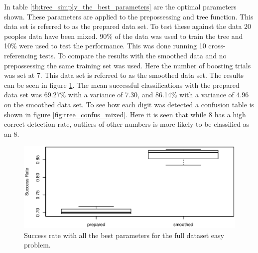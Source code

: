 In table \ref{tb:tree_simply_the_best_parameters} are the optimal parameters shown.
These parameters are applied to the prepossessing and tree function. 
This data set is referred to as the prepared data set.
To test these against the data 20 peoples data have been mixed.
90\% of the data was used to train the tree and 10\% were used to test the performance.
This was done running 10 cross-referencing tests. 
To compare the results with the smoothed data and no prepossessing the same training set was used.
Here the number of boosting trials was set at 7. 
This data set is referred to as the smoothed data set.
The results can be seen in figure \ref{fig:tree_performance_mixed}.
The mean successful classifications with the prepared data set was 69.27\% with a variance of 7.30, and 86.14\% with a variance of 4.96 on the smoothed data set.
To see how each digit was detected a confusion table is shown in figure \ref{fig:tree_confus_mixed}. 
Here it is seen that while 8 has a high correct detection rate, outliers of other numbers is more likely to be classified as an 8.

\begin{figure}[H]
\centering
\includegraphics[width=\textwidth]{graphics/tree_performance_mix_combined}
\caption{Success rate with all the best parameters for the full dataset easy problem.}
\label{fig:tree_performance_mixed}
\end{figure}

